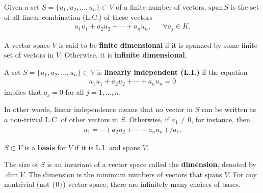 \begin{definition}
	Given a set $S=\{u_1,u_2,\dots,u_n\} \subset V$ of a finite number of vectors, $\mathrm{span}\,S$ is the set of all linear combination (L.C.) of these vectors
	\begin{align}
		a_1u_1 + a_2u_2 + \cdots + a_nu_n, && \forall a_j \in K.
	\end{align} 
\end{definition}

\noindent A vector space $V$ is said to be {\bf finite dimensional} if it is spanned by some finite set of vectors in $V$. Otherwise, it is {\bf infinite dimensional}.

\begin{definition}
	A set $S=\{u_1,u_2,\dots,u_n\} \subset V$ is {\bf linearly independent (L.I.)} if the equation
	\begin{align}
		a_1u_1 + a_2u_2 + \cdots + a_nu_n = 0
	\end{align}
	implies that $a_j = 0$ for all $j=1,\dots,n$. 
\end{definition}
\noindent In other words, linear independence means that no vector in $S$ can be written as a non-trivial L.C. of other vectors in $S$. Otherwise, if $a_1\neq 0$, for instance, then
\begin{align}
	u_1 = -(a_2 u_2 + \cdots + a_n u_n)/a_1.
\end{align}


\begin{definition}
	$S\subset V$ is a {\bf basis} for $V$ if it is L.I. and spans $V$.
\end{definition}
\noindent The size of $S$ is an invariant of a vector space called the {\bf dimension}, denoted by $\dim V$. The dimension is the minimum numbers of vectors that spans $V$. For any nontrivial (not $\{0\}$) vector space, there are infinitely many choices of bases.

